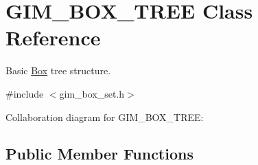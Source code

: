 \hypertarget{class_g_i_m___b_o_x___t_r_e_e}{\section{G\+I\+M\+\_\+\+B\+O\+X\+\_\+\+T\+R\+E\+E Class Reference}
\label{class_g_i_m___b_o_x___t_r_e_e}
}


Basic \hyperlink{class_box}{Box} tree structure.  




{\ttfamily \#include $<$gim\+\_\+box\+\_\+set.\+h$>$}



Collaboration diagram for G\+I\+M\+\_\+\+B\+O\+X\+\_\+\+T\+R\+E\+E\+:
\subsection*{Public Member Functions}
{\bf }\par
